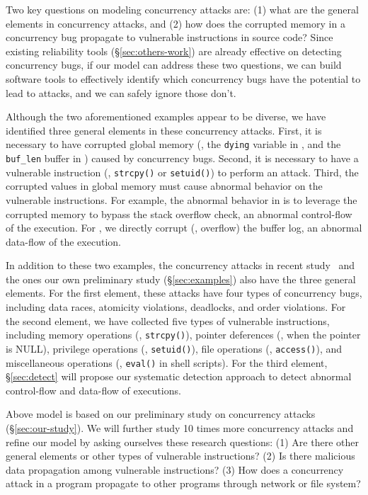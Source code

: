 Two key questions on modeling concurrency attacks are: (1) what are the general 
elements in concurrency attacks, and (2) how does the corrupted memory in a 
concurrency bug propagate to vulnerable instructions in source code? Since 
existing reliability tools (\S\ref{sec:others-work}) are already effective on 
detecting concurrency bugs, if our model can address these two questions, we 
can build software tools to effectively identify which concurrency bugs have 
the potential to lead to attacks, and we can safely ignore those don't.

Although the two aforementioned examples appear to be diverse, we have 
identified three general elements in these concurrency attacks. First, it is 
necessary to have corrupted global memory (\eg, the \texttt{dying} variable in 
\libsafe, and the \texttt{buf\_len} buffer in \apache) caused by concurrency 
bugs. Second, it is necessary to have a vulnerable instruction (\eg, 
\texttt{strcpy()} or 
\texttt{setuid()}) to perform an attack. Third, the corrupted values in global 
memory must cause abnormal behavior on the vulnerable instructions. For 
example, the abnormal behavior in \libsafe is to leverage the corrupted 
memory to bypass the stack overflow check, an abnormal control-flow of the 
execution. For \apache, we directly corrupt (\ie, overflow) the buffer 
log, an abnormal data-flow of the execution.

% 
In addition to these two examples, the \noldattacks concurrency 
attacks in recent study~\cite{con:hotpar12} and the \nattacks ones our own 
preliminary study (\S\ref{sec:examples}) also have the three general elements. 
For the first element, these attacks have four types of concurrency bugs, 
including data races, atomicity violations, deadlocks, and order violations. 
For the second element, we have collected five types of vulnerable 
instructions, including memory operations (\eg, \texttt{strcpy()}), pointer 
deferences (\eg, when the pointer is NULL), privilege operations (\eg, 
\texttt{setuid()}), file operations (\eg, \texttt{access()}), and miscellaneous 
operations (\eg, \texttt{eval()} in shell scripts). For the third element, 
\S\ref{sec:detect} will propose our systematic detection approach to detect 
abnormal control-flow and data-flow of executions.

 Above model is based on our preliminary study on \nattacks 
concurrency attacks (\S\ref{sec:our-study}). We will further study 10 times 
more concurrency attacks and refine our model by asking ourselves these 
research questions: (1) Are there other general elements or other types of 
vulnerable instructions? (2) Is there malicious data propagation among 
vulnerable instructions? (3) How does a concurrency attack in a program 
propagate to other programs through network or file system?

